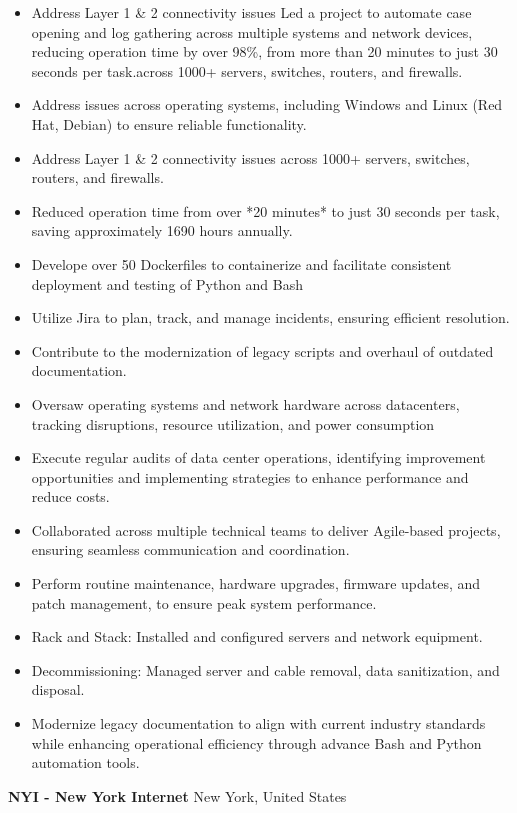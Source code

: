 \documentclass[a4paper]{article}
\begin{document}
\begin{itemize} \itemsep 1pt
	\item Address Layer 1 \& 2 connectivity issues Led a project to automate case opening and log gathering across multiple systems and network devices, reducing operation time by over 98\%, from more than 20 minutes to just 30 seconds per task.across 1000+ servers, switches, routers, and firewalls.
	\item Address issues across operating systems, including Windows and Linux (Red Hat, Debian) to ensure reliable functionality.
	\item Address Layer 1 \& 2 connectivity issues across 1000+ servers, switches, routers, and firewalls.
	\item Reduced operation time from over *20 minutes* to just 30 seconds per task, saving approximately 1690 hours annually.
	\item Develope over 50 Dockerfiles to containerize and facilitate consistent deployment and testing of Python and Bash
	\item Utilize Jira to plan, track, and manage incidents, ensuring efficient resolution.
	\item Contribute to the modernization of legacy scripts and overhaul of outdated documentation.
	\item Oversaw operating systems and network hardware across datacenters, tracking disruptions, resource utilization, and power consumption
	\item Execute regular audits of data center operations, identifying improvement opportunities and implementing strategies to enhance performance and reduce costs.
	\item Collaborated across multiple technical teams to deliver Agile-based projects, ensuring seamless communication and coordination.
	\item Perform routine maintenance, hardware upgrades, firmware updates, and patch management, to ensure peak system performance.
	\item Rack and Stack: Installed and configured servers and network equipment.
	\item Decommissioning: Managed server and cable removal, data sanitization, and disposal.
	\item Modernize legacy documentation to align with current industry standards while enhancing operational efficiency through advance Bash and Python automation tools.
\end{itemize}
\textbf{NYI - New York Internet} \hfill New York, United States\\
\end{document}
